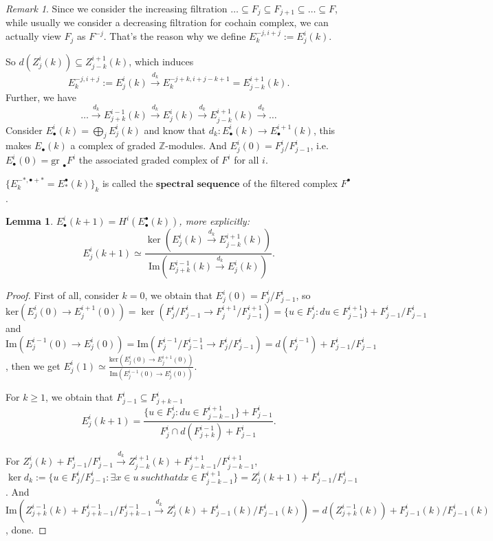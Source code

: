 \documentclass[openany]{book}
\newtheorem{lemma}[theorem]{Lemma}     %
\theoremstyle{definition} %
\theoremstyle{remark}
\newtheorem{remark}{Remark}[chapter] %
\begin{document}
\begin{remark}
    Since we consider the increasing filtration $\dots\subseteq F_{j}\subseteq F_{j+1}\subseteq \dots \subseteq F$, while usually we consider a decreasing filtration for cochain complex, we can actually view $F_{j}$ as $F^{-j}$. That's the reason why we define $E_{k}^{-j,i+j}:=E_{j}^{i}(k)$.
\end{remark}
So $d(Z_j^i(k)) \subseteq Z_{j-k}^{i+1}(k)$, which induces $$ E_k^{-j,i+j} := E_j^i(k) \xrightarrow{d_k} E_k^{-j+k,i+j-k+1} = E_{j-k}^{i+1}(k) .$$Further, we have $$\dots\xrightarrow{d_{k}}E_{j+k}^{i-1}(k)\xrightarrow{d_{k}}E_{j}^{i}(k)\xrightarrow{d_{k}}E_{j-k}^{i+1}(k)\xrightarrow{d_{k}} \dots$$Consider $E^{i}_{\bullet}(k)=\bigoplus\limits_{j}E^{i}_{j}(k)$ and know that $d_{k}:E^{i}_{\bullet}(k)\rightarrow E^{i+1}_{\bullet}(k)$, this makes $E_\bullet(k)$ a complex of graded $\mathbb{Z}$-modules.  And $E_{j}^{i}(0) = F^{i}_{j} /F_{j-1}^{i}$, i.e. $E^{i}_{\bullet}(0)=\text{gr }_{\bullet}  F^{i}$ the associated graded complex of  $F^{i}$ for all $i$.

$\{E_k^{-\ast,\bullet+\ast} = E_\ast^\bullet(k)\}_k$ is called the $\textbf{spectral sequence}$ of the filtered complex $F^{\bullet}$.

\begin{lemma}\label{lemma 7.4}
    $E_\bullet^i(k+1) = H^i(E_{\bullet}^{\bullet}(k))$, more explicitly: $$E^{i}_{j}(k+1)\simeq \frac{\ker(E_{j}^{i}(k)\xrightarrow{d_{k}}E_{j-k}^{i+1}(k) )}{\mathrm{Im}(E_{j+k}^{i-1}(k)\xrightarrow{d_{k}}E_{j}^{i}(k))}.$$
\end{lemma}
\begin{proof}
    \quad

    First of all, consider $k=0$, we obtain that $E^{i}_{j}(0)= F^{i}_{j} /F^{i}_{j-1}$, so $\mathrm{ker}(E^{i}_{j }(0)\rightarrow E^{i+1}_{j}(0))=\ker(F^{i}_{j} /F^{i}_{j-1}\rightarrow F^{i+1}_{j} /F^{i+1}_{j-1})=\{u\in F^{i}_{j}:du\in F^{i+1}_{j-1}\}+F^{i}_{j-1} /F^{i}_{j-1}$ and $\mathrm{Im}(E^{i-1}_{j}(0)\rightarrow E^{i}_{j}(0))=\mathrm{Im}(F^{i-1}_{j} /F^{i-1}_{j-1}\rightarrow F^{i}_{j} /F^{i}_{j-1})=d(F^{i-1}_{j})+F^{i}_{j-1} /F^{i}_{j-1}$, then we get $E^{i}_{j}(1)\simeq \frac{\mathrm{ker}(E^{i}_{j }(0)\rightarrow E^{i+1}_{j}(0))}{\mathrm{Im}(E^{i-1}_{j}(0)\rightarrow E^{i}_{j}(0))}$.

    For $k\ge 1$, we obtain that $F_{j-1}^{i}\subseteq F_{j+k-1}^{i}$$$E^{i}_{j}(k+1)=\frac{\{u\in F^{i}_{j}:du\in F^{i+1}_{j-k-1}\}+F^{i}_{j-1}}{F^{i}_{j}\cap d(F^{i-1}_{j+k})+F^{i}_{j-1}}.$$

        For $Z^{i}_{j}(k)+F^{i}_{j-1} /F^{i}_{j-1}\xrightarrow{d_{k}}Z_{j-k}^{i+1}(k)+F^{i+1}_{j-k-1} /F^{i+1}_{j-k-1}$, $\ker d_{k}:=\{u\in F^{i}_{j} /F_{j-1}^{i}: \exists x\in u\ such that dx\in F^{i+1}_{j-k-1}\}=Z^{i}_{j}(k+1)+F^{i}_{j-1} /F^{i}_{j-1}$. And $\mathrm{Im}(Z^{i-1}_{j+k}(k)+F^{i-1}_{j+k-1} /F^{i-1}_{j+k-1}\xrightarrow{d_{k}}Z^{i}_{j}(k)+F^{i}_{j-1}(k) /F^{i}_{j-1}(k))=d(Z^{i-1}_{j+k}(k))+F^{i}_{j-1}(k) /F^{i}_{j-1}(k)$, done.
\end{proof}
\end{document}

